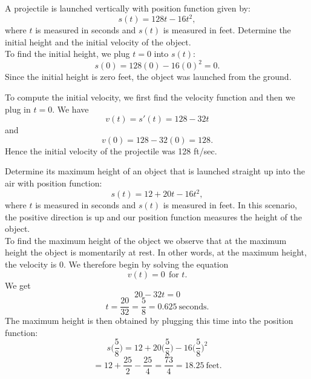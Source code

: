 \documentclass{ximera}
\begin{document}

\begin{example}
A projectile is launched vertically with position function given by:
\[s(t) = 128t - 16t^2,\]
where $t$ is measured in seconds and $s(t)$ is measured in feet.
Determine the initial height and the initial velocity of the object.\\

To find the initial height, we plug $t = 0$ into $s(t)$:
\[s(0) = 128(0) - 16(0)^2 = 0.\]
Since the initial height is zero feet, the object was launched from the ground.

To compute the initial velocity, we first find the velocity function and then we plug in $t=0$.
We have
\[v(t) = s'(t) = 128 - 32t\]
and 
\[v(0) = 128 - 32(0) = 128.\]
Hence the initial velocity of the projectile was 128 ft/sec.

\end{example}




\begin{example}
Determine its maximum height
of an object that is launched straight up into the air with position function:
\[s(t) = 12 + 20t - 16t^2,\]
where $t$ is measured in seconds and $s(t)$ is measured in feet. 
In this scenario, the positive direction is up and our position function measures the height of the object.\\
To find the maximum height of the object we observe that at the maximum height the object is momentarily at rest. 
In other words, at the maximum height, the velocity is 0. We therefore begin by solving the equation
\[v(t) = 0  \  \ \text{for $t$.}\]
 We get 
\[20-32t = 0\]
\[t = \frac{20}{32} = \frac{5}{8} = 0.625 \ \text{seconds}.\]
The maximum height is then obtained by plugging this time into the position function:
\[s\Big(\frac{5}{8}\Big) = 12 + 20\Big(\frac{5}{8}\Big) - 16\Big(\frac{5}{8}\Big)^2 \]
\[= 12 + \frac{25}{2} - \frac{25}{4} = \frac{73}{4} = 18.25\  \text{feet}. \]
\end{example}
\end{document}
